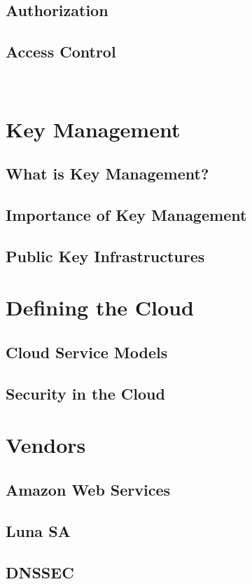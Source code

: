 	\subsection{Authorization}

	\subsection{Access Control}\

\section{Key Management}
	\subsection{What is Key Management?}

	\subsection{Importance of Key Management}

	\subsection{Public Key Infrastructures}

\section{Defining the Cloud}
	\subsection{Cloud Service Models}

	\subsection{Security in the Cloud}

\section{Vendors}
	\subsection{Amazon Web Services}

	\subsection{Luna SA}

	\subsection{DNSSEC}
